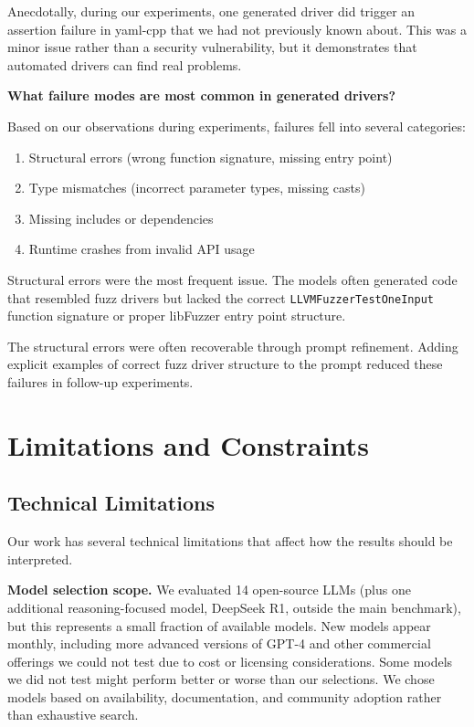 Anecdotally, during our experiments, one generated driver did trigger an assertion failure in yaml-cpp that we had not previously known about. This was a minor issue rather than a security vulnerability, but it demonstrates that automated drivers can find real problems.

\textbf{What failure modes are most common in generated drivers?}

Based on our observations during experiments, failures fell into several categories:

\begin{enumerate}
    \item Structural errors (wrong function signature, missing entry point)
    \item Type mismatches (incorrect parameter types, missing casts)
    \item Missing includes or dependencies
    \item Runtime crashes from invalid API usage
\end{enumerate}

Structural errors were the most frequent issue. The models often generated code that resembled fuzz drivers but lacked the correct \texttt{LLVMFuzzerTestOneInput} function signature or proper libFuzzer entry point structure.

The structural errors were often recoverable through prompt refinement. Adding explicit examples of correct fuzz driver structure to the prompt reduced these failures in follow-up experiments.


\section{Limitations and Constraints}
\label{sec:discussion_limitations}

\subsection{Technical Limitations}
\label{sec:discussion_tech_limits}

Our work has several technical limitations that affect how the results should be interpreted.

\textbf{Model selection scope.} We evaluated 14 open-source LLMs (plus one additional reasoning-focused model, DeepSeek R1, outside the main benchmark), but this represents a small fraction of available models. New models appear monthly, including more advanced versions of GPT-4 \cite{gpt4} and other commercial offerings we could not test due to cost or licensing considerations. Some models we did not test might perform better or worse than our selections. We chose models based on availability, documentation, and community adoption rather than exhaustive search.

